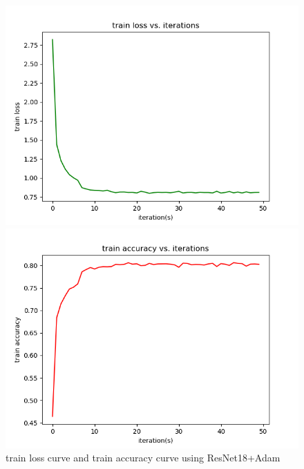 \documentclass[cn]{elegantbook}
\begin{document}
\begin{figure}[!h]
	\centering
	\begin{minipage}[t]{0.48\textwidth}
		\centering
		\includegraphics[width=\textwidth]{../results/trainloss_res_adam}
	\end{minipage}
	\begin{minipage}[t]{0.48\textwidth}
		\centering
		\includegraphics[width=\textwidth]{../results/trainacc_res_adam}
	\end{minipage}
	\caption{\label{trainres_res_adam}train loss curve and train accuracy curve using ResNet18+Adam}
\end{figure}
\end{document}
